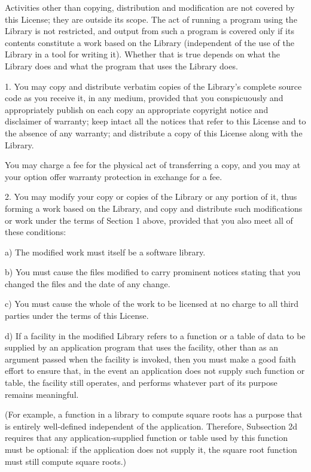 \documentclass[twoside]{tceusermanual}
\begin{document}
Activities other than copying, distribution and modification are
not covered by this License; they are outside its scope.  The
act of running a program using the Library is not restricted,
and output from such a program is covered only if its contents
constitute a work based on the Library (independent of the use
of the Library in a tool for writing it).  Whether that is true
depends on what the Library does and what the program that uses
the Library does.
  
1. You may copy and distribute verbatim copies of the Library's
complete source code as you receive it, in any medium, provided
that you conspicuously and appropriately publish on each copy an
appropriate copyright notice and disclaimer of warranty; keep
intact all the notices that refer to this License and to the
absence of any warranty; and distribute a copy of this License
along with the Library.

You may charge a fee for the physical act of transferring a
copy, and you may at your option offer warranty protection in
exchange for a fee.
 
2. You may modify your copy or copies of the Library or any
portion of it, thus forming a work based on the Library, and
copy and distribute such modifications or work under the terms
of Section 1 above, provided that you also meet all of these
conditions:

    a) The modified work must itself be a software library.

    b) You must cause the files modified to carry prominent notices
    stating that you changed the files and the date of any change.

    c) You must cause the whole of the work to be licensed at no
    charge to all third parties under the terms of this License.

    d) If a facility in the modified Library refers to a function or a
    table of data to be supplied by an application program that uses
    the facility, other than as an argument passed when the facility
    is invoked, then you must make a good faith effort to ensure that,
    in the event an application does not supply such function or
    table, the facility still operates, and performs whatever part of
    its purpose remains meaningful.

    (For example, a function in a library to compute square roots has
    a purpose that is entirely well-defined independent of the
    application.  Therefore, Subsection 2d requires that any
    application-supplied function or table used by this function must
    be optional: if the application does not supply it, the square
    root function must still compute square roots.)
\end{document}
